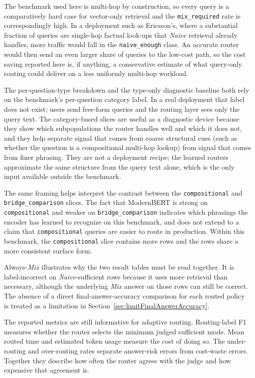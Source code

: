 \documentclass[english, bibtex]{kththesis}               %
\numberwithin{listing}{chapter}
\begin{document}
The benchmark used here is multi-hop by construction, so every query is a comparatively hard case for vector-only retrieval and the \texttt{mix\_required} rate is correspondingly high. In a deployment such as Ericsson's, where a substantial fraction of queries are single-hop factual look-ups that \emph{Naive} retrieval already handles, more traffic would fall in the \texttt{naive\_enough} class. An accurate router would then send an even larger share of queries to the low-cost path, so the cost saving reported here is, if anything, a conservative estimate of what query-only routing could deliver on a less uniformly multi-hop workload.

The per-question-type breakdown and the type-only diagnostic baseline both rely on the benchmark's per-question category label. In a real deployment that label does not exist; users send free-form queries and the routing layer sees only the query text. The category-based slices are useful as a diagnostic device because they show which subpopulations the router handles well and which it does not, and they help separate signal that comes from coarse structural cues (such as whether the question is a compositional multi-hop lookup) from signal that comes from finer phrasing. They are not a deployment recipe; the learned routers approximate the same structure from the query text alone, which is the only input available outside the benchmark.

The same framing helps interpret the contrast between the \texttt{compositional} and \texttt{bridge\_comparison} slices. The fact that ModernBERT is strong on \texttt{compositional} and weaker on \texttt{bridge\_comparison} indicates which phrasings the encoder has learned to recognize on this benchmark, and does not extend to a claim that \texttt{compositional} queries are easier to route in production. Within this benchmark, the \texttt{compositional} slice contains more rows and the rows share a more consistent surface form.

Always-\emph{Mix} illustrates why the two result tables must be read together. It is label-incorrect on \emph{Naive}-sufficient rows because it uses more retrieval than necessary, although the underlying \emph{Mix} answer on those rows can still be correct. The absence of a direct final-answer-accuracy comparison for each routed policy is treated as a limitation in Section~\ref{sec:limitFinalAnswerAccuracy}.

The reported metrics are still informative for adaptive routing. Routing-label F1 measures whether the router selects the minimum judged sufficient mode. Mean routed time and estimated token usage measure the cost of doing so. The under-routing and over-routing rates separate answer-risk errors from cost-waste errors. Together they describe how often the router agrees with the judge and how expensive that agreement is.
\end{document}
